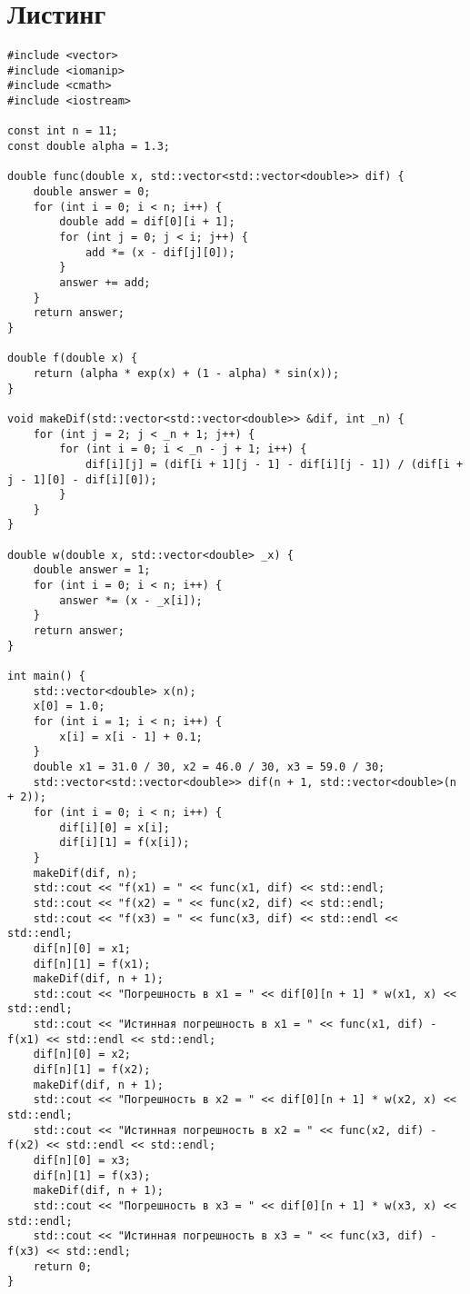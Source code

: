 \documentclass[10pt]{scrartcl}
\makeatletter
\newcommand{\verbatimfont}[1]{\renewcommand{\verbatim@font}{\ttfamily#1}}
\makeatother
\begin{document}
\section*{Листинг}
\verbatimfont{\small}
\begin{verbatim}
#include <vector>
#include <iomanip>
#include <cmath>
#include <iostream>

const int n = 11;
const double alpha = 1.3;

double func(double x, std::vector<std::vector<double>> dif) {
    double answer = 0;
    for (int i = 0; i < n; i++) {
        double add = dif[0][i + 1];
        for (int j = 0; j < i; j++) {
            add *= (x - dif[j][0]);
        }
        answer += add;
    }
    return answer;
}

double f(double x) {
    return (alpha * exp(x) + (1 - alpha) * sin(x));
}

void makeDif(std::vector<std::vector<double>> &dif, int _n) {
    for (int j = 2; j < _n + 1; j++) {
        for (int i = 0; i < _n - j + 1; i++) {
            dif[i][j] = (dif[i + 1][j - 1] - dif[i][j - 1]) / (dif[i + j - 1][0] - dif[i][0]);
        }
    }
}

double w(double x, std::vector<double> _x) {
    double answer = 1;
    for (int i = 0; i < n; i++) {
        answer *= (x - _x[i]);
    }
    return answer;
}

int main() {
    std::vector<double> x(n);
    x[0] = 1.0;
    for (int i = 1; i < n; i++) {
        x[i] = x[i - 1] + 0.1;
    }
    double x1 = 31.0 / 30, x2 = 46.0 / 30, x3 = 59.0 / 30;
    std::vector<std::vector<double>> dif(n + 1, std::vector<double>(n + 2));
    for (int i = 0; i < n; i++) {
        dif[i][0] = x[i];
        dif[i][1] = f(x[i]);
    }
    makeDif(dif, n);
    std::cout << "f(x1) = " << func(x1, dif) << std::endl;
    std::cout << "f(x2) = " << func(x2, dif) << std::endl;
    std::cout << "f(x3) = " << func(x3, dif) << std::endl << std::endl;
    dif[n][0] = x1;
    dif[n][1] = f(x1);
    makeDif(dif, n + 1);
    std::cout << "Погрешность в х1 = " << dif[0][n + 1] * w(x1, x) << std::endl;
    std::cout << "Истинная погрешность в x1 = " << func(x1, dif) - f(x1) << std::endl << std::endl;
    dif[n][0] = x2;
    dif[n][1] = f(x2);
    makeDif(dif, n + 1);
    std::cout << "Погрешность в х2 = " << dif[0][n + 1] * w(x2, x) << std::endl;
    std::cout << "Истинная погрешность в x2 = " << func(x2, dif) - f(x2) << std::endl << std::endl;
    dif[n][0] = x3;
    dif[n][1] = f(x3);
    makeDif(dif, n + 1);
    std::cout << "Погрешность в х3 = " << dif[0][n + 1] * w(x3, x) << std::endl;
    std::cout << "Истинная погрешность в x3 = " << func(x3, dif) - f(x3) << std::endl;
    return 0;
}
\end{verbatim}
\end{document}
